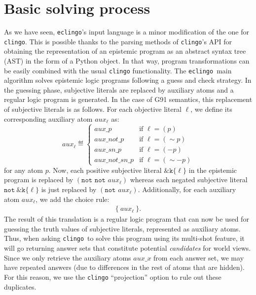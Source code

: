 \documentclass{new_tlp}
\def\eclingo{{\tt eclingo}}
\def\clingo{{\tt clingo}}
\begin{document}
\section{Basic solving process}
\label{sec:impl}
As we have seen, \eclingo's input language is a minor modification of the one for \clingo{}.
This is possible thanks to the parsing methods of \clingo's API for obtaining the representation of an epistemic program as an abstract syntax tree (AST)
in the form of a Python object.
%
In that way, program transformations can be easily combined with the usual \clingo{} functionality.
%
The \eclingo\ main algorithm solves epistemic logic programs following a guess and check strategy.
%
In the guessing phase, subjective literals are replaced by auxiliary atoms and a regular logic program is generated.
%
In the case of G91 semantics, this replacement of subjective literals is as follows.
%
For each objective literal $\ell$, we define its corresponding auxiliary atom $\mathit{aux}_\ell$ as:
\[
\mathit{aux}_\ell \eqdef \left\{
\begin{array}{ll}
\mathit{aux}\_p & \text{if } \ell=(p) \\
\mathit{aux\_not}\_p & \text{if } \ell=(\sim p) \\
\mathit{aux\_sn}\_p & \text{if } \ell=(- p) \\
\mathit{aux\_not\_sn}\_p & \text{if } \ell=(\sim - p)
\end{array}
\right.
\]
for any atom $p$. 
%
Now, each positive subjective literal $\mathtt{\&k\{}\ell \mathtt{\}}$ in the epistemic program is replaced by $(\texttt{not\ not\ } \mathit{aux}_\ell)$ whereas each negated subjective literal $\mathtt{not \ \&k\{}\ell \mathtt{\}}$ is just replaced by $(\texttt{not\ } \mathit{aux}_\ell)$.
%
Additionally, for each auxiliary atom $\mathit{aux_\ell}$, we add the choice rule:
\begin{align*}
    \mathtt{\{}\ aux_\ell \ \mathtt{\}.}
\end{align*}
The result of this translation is a regular logic program that can now be used for guessing the truth values of subjective literals, represented as auxiliary atoms.
%
Thus, when asking \clingo\ to solve this program using its multi-shot feature, it will go returning answer sets that constitute potential \emph{candidates} for world views.
%
Since we only retrieve the auxiliary atoms $\mathit{aux\_x}$ from each answer set, we may have repeated answers (due to differences in the rest of atoms that are hidden).
%
For this reason, we use the \clingo{} ``projection'' option to rule out these duplicates.
\end{document}
